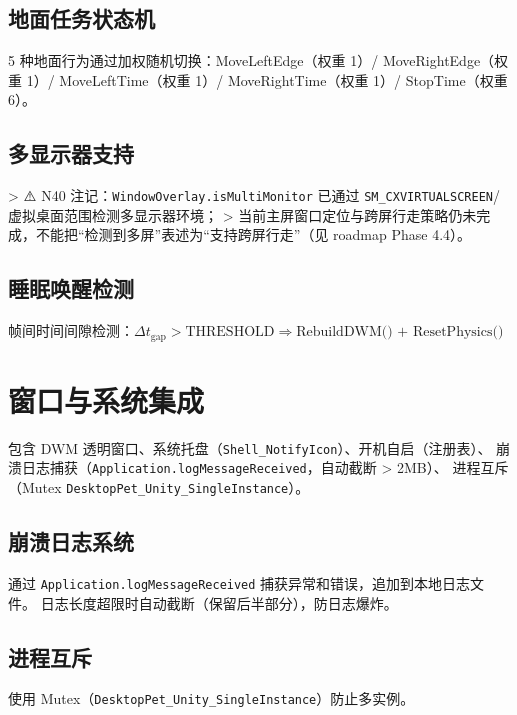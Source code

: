 \documentclass[12pt,a4paper]{ctexart}
\begin{document}
\subsection{地面任务状态机}

5 种地面行为通过加权随机切换：MoveLeftEdge（权重 1）/ MoveRightEdge（权重 1）/
MoveLeftTime（权重 1）/ MoveRightTime（权重 1）/ StopTime（权重 6）。

\subsection{多显示器支持}

> ⚠️ N40 注记：\texttt{WindowOverlay.isMultiMonitor} 已通过 \texttt{SM\_CXVIRTUALSCREEN}/虚拟桌面范围检测多显示器环境；
> 当前主屏窗口定位与跨屏行走策略仍未完成，不能把“检测到多屏”表述为“支持跨屏行走”（见 roadmap Phase 4.4）。

\subsection{睡眠唤醒检测}

帧间时间间隙检测：$\Delta t_{\text{gap}} > \text{THRESHOLD} \Rightarrow \text{RebuildDWM() + ResetPhysics()}$

\section{窗口与系统集成}

包含 DWM 透明窗口、系统托盘（\texttt{Shell\_NotifyIcon}）、开机自启（注册表）、
崩溃日志捕获（\texttt{Application.logMessageReceived}，自动截断 > 2MB）、
进程互斥（Mutex \texttt{DesktopPet\_Unity\_SingleInstance}）。

\subsection{崩溃日志系统}

通过 \texttt{Application.logMessageReceived} 捕获异常和错误，追加到本地日志文件。
日志长度超限时自动截断（保留后半部分），防日志爆炸。

\subsection{进程互斥}

使用 Mutex（\texttt{DesktopPet\_Unity\_SingleInstance}）防止多实例。

\end{document}
